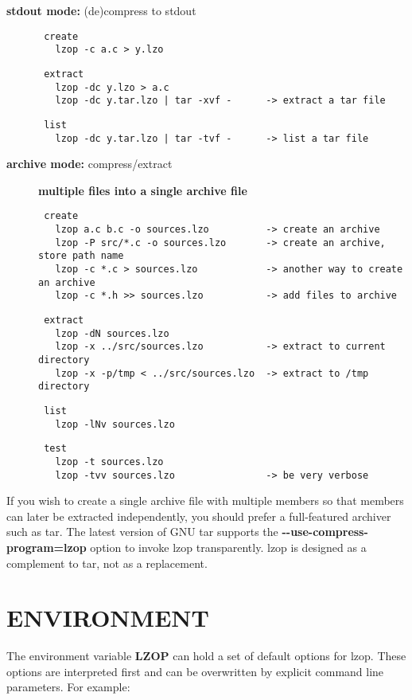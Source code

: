\begin{description}
\item[{\textbf{stdout mode:} (de)compress to stdout}] \mbox{}\begin{verbatim}
 create
   lzop -c a.c > y.lzo
\end{verbatim}
\begin{verbatim}
 extract
   lzop -dc y.lzo > a.c
   lzop -dc y.tar.lzo | tar -xvf -      -> extract a tar file
\end{verbatim}
\begin{verbatim}
 list
   lzop -dc y.tar.lzo | tar -tvf -      -> list a tar file
\end{verbatim}

\item[{\textbf{archive mode:} compress/extract}] \textbf{multiple files into a single archive file}\begin{verbatim}
 create
   lzop a.c b.c -o sources.lzo          -> create an archive
   lzop -P src/*.c -o sources.lzo       -> create an archive, store path name
   lzop -c *.c > sources.lzo            -> another way to create an archive
   lzop -c *.h >> sources.lzo           -> add files to archive
\end{verbatim}
\begin{verbatim}
 extract
   lzop -dN sources.lzo
   lzop -x ../src/sources.lzo           -> extract to current directory
   lzop -x -p/tmp < ../src/sources.lzo  -> extract to /tmp directory
\end{verbatim}
\begin{verbatim}
 list
   lzop -lNv sources.lzo
\end{verbatim}
\begin{verbatim}
 test
   lzop -t sources.lzo
   lzop -tvv sources.lzo                -> be very verbose
\end{verbatim}
\end{description}


If you wish to create a single archive file with multiple
members so that members can later be extracted independently,
you should prefer a full-featured archiver such as
tar. The latest version of GNU tar supports the
\textbf{-{}-use-compress-program=lzop} option to invoke lzop transparently.
lzop is designed as a complement to tar, not as
a replacement.

\section{ENVIRONMENT\label{ENVIRONMENT}}


The environment variable \textbf{LZOP} can hold a set of default
options for lzop. These options are interpreted first and
can be overwritten by explicit command line parameters.
For example:

